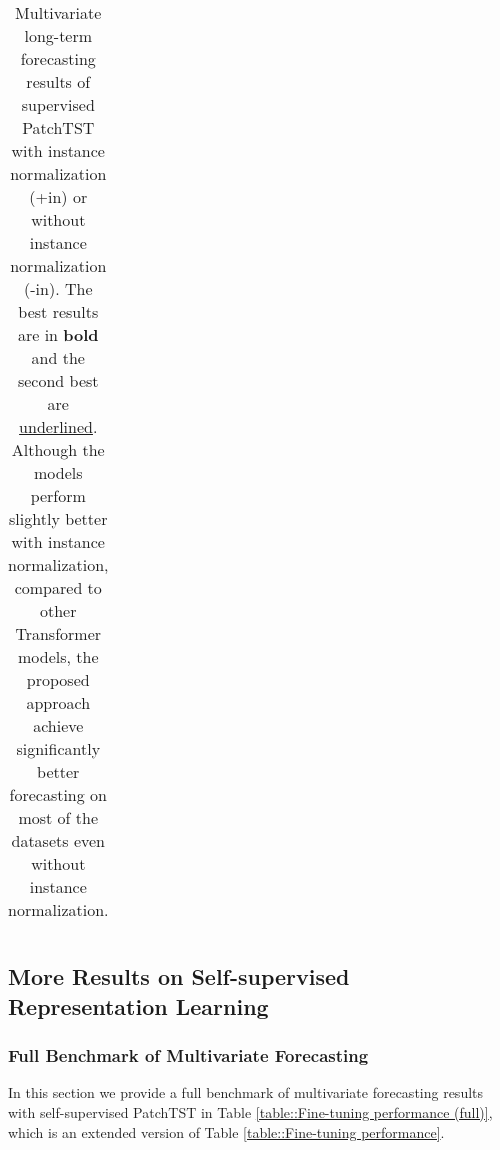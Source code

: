 \documentclass{article} \usepackage{iclr2023_conference,times}
\begin{document}
\begin{table*}[t]
{\begin{tabular}{cc|c||cc|cc|cc|cc||cc|cc|ccc}
			\cline{2-17}
		\end{tabular}
	}
	\caption{Multivariate long-term forecasting results of supervised PatchTST with instance normalization (+in) or without instance normalization (-in). The best results are in \textbf{bold} and the second best are \uline{underlined}. Although the models perform slightly better with instance normalization, compared to other Transformer models, the proposed approach achieve significantly better forecasting on most of the datasets even without instance normalization. }
	\label{tab:with and without IN}
\end{table*}
\linespread{1}




\subsection{More Results on Self-supervised Representation Learning}
\label{append:self-sup}

\subsubsection{Full Benchmark of Multivariate Forecasting}

In this section we provide a full benchmark of multivariate forecasting results with self-supervised PatchTST in Table \ref{table::Fine-tuning performance (full)}, which is an extended version of Table \ref{table::Fine-tuning performance}. 
\end{document}
